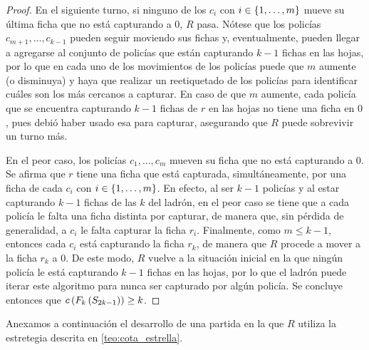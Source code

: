 \begin{proof}
    En el siguiente turno, si ninguno de los $c_{i}$ con $i\in\{1,\dots, m\}$ mueve
    su \'ultima ficha que no est\'a capturando a $0$, $R$ pasa. N\'otese que los
    polic\'ias $c_{m+1},\dots,c_{{k-1}}$ pueden seguir moviendo sus fichas y,
    eventualmente, pueden llegar a agregarse al conjunto de polic\'ias que
    est\'an capturando $k-1$ fichas en las hojas, por lo que en cada uno de los
    movimientos de los polic\'ias puede que $m$ aumente (o disminuya) y haya que
    realizar un reetiquetado de los polic\'ias para identificar cu\'ales son los
    m\'as cercanos a capturar. En caso de que $m$ aumente, cada polic\'ia que se
    encuentra capturando $k-1$ fichas de $r$ en las hojas no tiene una ficha en
    $0$, pues debi\'o haber usado esa para capturar, asegurando que $R$ puede
    sobrevivir un turno m\'as.

    En el peor caso, los polic\'ias $c_1,\dots, c_m$ mueven su ficha que no
    est\'a capturando a $0$. Se afirma que $r$ tiene una ficha que est\'a
    capturada, simult\'aneamente, por una ficha de cada $c_{i}$ con $i\in
    \{1,\dots, m\}$. En efecto, al ser $k-1$ polic\'ias y al estar capturando $k-1$
    fichas de las $k$ del ladr\'on, en el peor caso se tiene que a cada
    polic\'ia le falta una ficha distinta por capturar, de manera que, sin
    p\'erdida de generalidad, a $c_{i}$ le falta capturar la ficha $r_i$.
    Finalmente, como $m\leq k-1$, entonces cada $c_{i}$ est\'a capturando la
    ficha $r_k$, de manera que $R$ procede a mover a la ficha $r_k$ a $0$. De
    este modo, $R$ vuelve a la situaci\'on inicial en la que ning\'un polic\'ia
    le est\'a capturando $k-1$ fichas en las hojas, por lo que el ladr\'on puede
    iterar este algoritmo para nunca ser capturado por alg\'un polic\'ia. Se
    concluye entonces que $c\left( F_{k}\left( S_{2k-1}\right)\right) \ge k$.

\end{proof}

Anexamos a continuaci\'on el desarrollo de una partida en la que $R$ utiliza la
estretegia descrita en \cref{teo:cota_estrella}.

